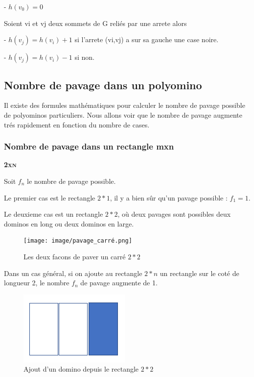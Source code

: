 \documentclass{article}
\begin{document}
- $h\left ( v_{0} \right )= 0$

Soient vi et vj deux sommets de G reliés par une arrete alors

- $h\left ( v_{j} \right )= h\left ( v_{i} \right ) + 1$ si l'arrete (vi,vj) a sur sa gauche une case noire.

- $h\left ( v_{j} \right )= h\left ( v_{i} \right ) - 1$ si non.




\newpage

\subsection{Nombre de pavage dans un polyomino}

\hspace{1cm}

Il existe des formules mathématiques pour calculer le nombre de pavage possible de polyominos particuliers. Nous allons voir que le nombre de pavage augmente trés rapidement en fonction du nombre de cases.

\hspace{1cm}

\subsubsection{Nombre de pavage dans un rectangle mxn}

\hspace{1.5cm}

\textbf{\textsc{2xn}}

Soit $f_{n}$ le nombre de pavage possible.

Le premier cas est le rectangle $2*1$, il y a bien sûr qu’un pavage possible : $f_{1} = 1$.

Le deuxieme cas est un rectangle $2*2$, où deux pavages sont possibles deux dominos en long ou deux dominos en large.

\begin{figure} [!h]
    \center
    \texttt{[image: image/pavage\_carré.png]}
    \caption{Les deux facons de paver un carré  $2*2$}
\end{figure}

Dans un cas général, si on ajoute au rectangle $2*n$ un rectangle sur le coté de longueur 2, le nombre $f_{n}$ de pavage augmente de 1.

\begin{figure} [!h]
    \center
    \includegraphics [scale=0.5] {image/domino_n+1.png}
    \caption{Ajout d'un domino depuis le rectangle $2*2$}
\end{figure}
\end{document}
